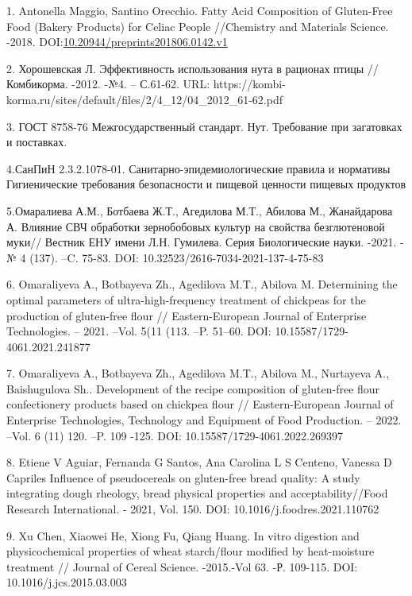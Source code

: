 	\begin{references}
1. Antonella Maggio, Santino Orecchio. Fatty Acid Composition of
Gluten-Free Food (Bakery Products) for Celiac People //Chemistry and
Materials Science. -2018.
DOI:\href{http://dx.doi.org/10.20944/preprints201806.0142.v1}{10.20944/preprints201806.0142.v1}

2. Хорошевская Л. Эффективность использования нута в рационах птицы //
Комбикорма. -2012. -№4. -- С.61-62. URL:
https://kombi-korma.ru/sites/default/files/2/4\_12/04\_2012\_61-62.pdf

3. ГОСТ 8758-76 Межгосударственный стандарт. Нут. Требование при
загатовках и поставках.

4.СанПиН 2.3.2.1078-01. Санитарно-эпидемиологические правила и нормативы
Гигиенические требования безопасности и пищевой ценности пищевых
продуктов

5.Омаралиева А.М., Ботбаева Ж.Т., Агедилова М.Т., Абилова М.,
Жанайдарова А. Влияние СВЧ обработки зернобобовых культур на свойства
безглютеновой муки// Вестник ЕНУ имени Л.Н. Гумилева. Серия
Биологические науки. -2021. -№ 4 (137). --C. 75-83. DOI:
10.32523/2616-7034-2021-137-4-75-83

6. Omaraliyeva A., Botbayeva Zh., Agedilova M.T., Abilova M. Determining
the optimal parameters of ultra-high-frequency treatment of chickpeas
for the production of gluten-free flour // Eastern-European Journal of
Enterprise Technologies. -- 2021. --Vol. 5(11 (113. --P. 51--60. \linebreak DOI:
10.15587/1729-4061.2021.241877

7. Omaraliyeva A., Botbayeva Zh., Agedilova M.T., Abilova M., Nurtayeva
A., Baishugulova Sh.. \linebreak Development of the recipe composition of
gluten-free flour confectionery products based on chickpea flour //
Eastern-European Journal of Enterprise Technologies, Technology and
Equipment of Food \linebreak Production. -- 2022. --Vol. 6 (11) 120. --P. 109 -125.
DOI: 10.15587/1729-4061.2022.269397

8. Etiene V Aguiar, Fernanda G Santos, Ana Carolina L S Centeno, Vanessa
D Capriles Influence of pseudocereals on gluten-free bread quality: A
study integrating dough rheology, bread physical properties and
acceptability//Food Research International. - 2021, Vol. 150. DOI:
10.1016/j.foodres.2021.110762

9. Xu Chen, Xiaowei He, Xiong Fu, Qiang Huang. In vitro digestion and
physicochemical properties of wheat starch/flour modified by
heat-moisture treatment // Journal of Cereal Science. -2015.-Vol 63. -Р.
109-115. DOI: 10.1016/j.jcs.2015.03.003


\end{references}
